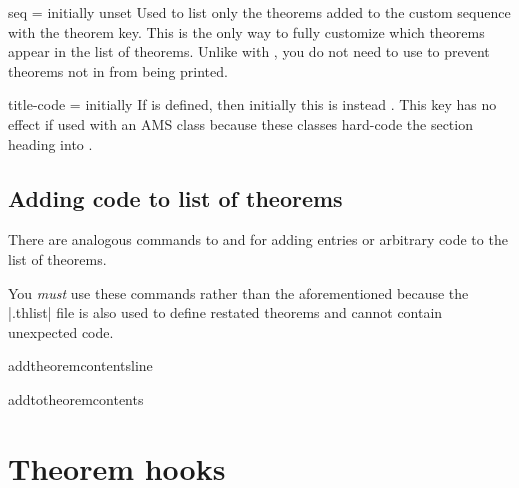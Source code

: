 \documentclass{ltxdoc}
\newcommand{\ttbraces}[1]{\braces{\texttt{#1}}}
\begin{document}
\begin{docKey}[][doc label=listof/seq]{seq}
  {=}
  {initially unset}
Used to list only the theorems added to the custom sequence  with the  theorem key.
This is the only way to fully customize which theorems appear in the list of theorems.
Unlike with , you do not need to use  to prevent theorems not in  from being printed.
\end{docKey}

\begin{docKey}{title-code}
  {=}
  {initially \ttbraces{\#1}}
If  is defined, then initially this is instead \ttbraces{\#1}. This key has no effect if used with an AMS class because these classes hard-code the section heading into .
\end{docKey}

\subsection{Adding code to list of theorems}

There are analogous commands to  and  for adding entries or arbitrary code to the list of theorems.

\begin{notebox}
You \emph{must} use these commands rather than the aforementioned because the |.thlist| file is also used to define restated theorems and cannot contain unexpected code.
\end{notebox}

\begin{docCommand}{addtheoremcontentsline}
  {}

\end{docCommand}

\begin{docCommand}{addtotheoremcontents}
  {}

\end{docCommand}

\section{Theorem hooks} \label{keythms-hooks}
\end{document}
